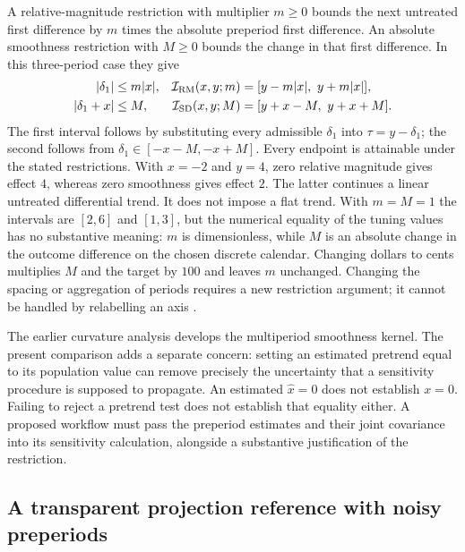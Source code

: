 A relative-magnitude restriction with multiplier $m\geq0$ bounds the next
untreated first difference by $m$ times the absolute preperiod first difference.
An absolute smoothness restriction with $M\geq0$ bounds the change in that
first difference. In this three-period case they give
\begin{align}
 |\delta_1|&\leq m|x|,
 &\mathcal I_{\rm RM}(x,y;m)&=[y-m|x|,\ y+m|x|],
 \label{exec22:hd-rm}\\
 |\delta_1+x|&\leq M,
 &\mathcal I_{\rm SD}(x,y;M)&=[y+x-M,\ y+x+M].
 \label{exec22:hd-sd}
\end{align}
The first interval follows by substituting every admissible $\delta_1$ into
$\tau=y-\delta_1$; the second follows from
$\delta_1\in[-x-M,-x+M]$. Every endpoint is attainable under the stated
restrictions. With $x=-2$ and $y=4$, zero relative magnitude gives effect $4$,
whereas zero smoothness gives effect $2$. The latter continues a linear
untreated differential trend. It does not impose a flat trend. With $m=M=1$
the intervals are $[2,6]$ and $[1,3]$, but the numerical equality of the tuning
values has no substantive meaning: $m$ is dimensionless, while $M$ is an
absolute change in the outcome difference on the chosen discrete calendar.
Changing dollars to cents multiplies $M$ and the target by $100$ and leaves
$m$ unchanged. Changing the spacing or aggregation of periods requires a new
restriction argument; it cannot be handled by relabelling an axis
\citep{rambachan2023,exec22_honestdid_reference}.

The earlier curvature analysis develops the multiperiod smoothness kernel.
The present comparison adds a separate concern: setting an estimated pretrend
equal to its population value can remove precisely the uncertainty that a
sensitivity procedure is supposed to propagate. An estimated $\widehat x=0$
does not establish $x=0$. Failing to reject a pretrend test does not establish
that equality either. A proposed workflow must pass the preperiod estimates
and their joint covariance into its sensitivity calculation, alongside a
substantive justification of the restriction.

\subsection{A transparent projection reference with noisy preperiods}
\label{exec22:hd-projection}

